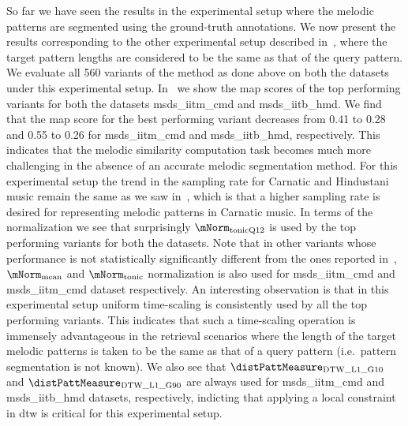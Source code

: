 So far we have seen the results in the experimental setup where the melodic patterns are segmented using the ground-truth annotations. We now present the results corresponding to the other experimental setup described in~, where the target pattern lengths are considered to be the same as that of the query pattern. We evaluate all 560 variants of the method as done above on both the datasets under this experimental setup. In~ we show the \gls{map} scores of the top performing variants for both the datasets \acrshort{msds_iitm_cmd} and \acrshort{msds_iitb_hmd}. We find that the \gls{map} score for the best performing variant decreases from 0.41 to 0.28 and 0.55 to 0.26 for \acrshort{msds_iitm_cmd} and \acrshort{msds_iitb_hmd}, respectively. This indicates that the melodic similarity computation task becomes much more challenging in the absence of an accurate melodic segmentation method. For this experimental setup the trend in the sampling rate for Carnatic and Hindustani music remain the same as we saw in~, which is that a higher sampling rate is desired for representing melodic patterns in Carnatic music. In terms of the normalization we see that surprisingly $\mNorm_{\mathrm{tonicQ12}}$ is used by the top performing variants for both the datasets. Note that in other variants whose performance is not statistically significantly different from the ones reported in~, $\mNorm_{\mathrm{mean}}$ and $\mNorm_{\mathrm{tonic}}$ normalization is also used for \acrshort{msds_iitm_cmd} and \acrshort{msds_iitm_cmd} dataset respectively. An interesting observation is that in this experimental setup uniform time-scaling is consistently used by all the top performing variants. This indicates that such a time-scaling operation is immensely advantageous in the retrieval scenarios where the length of the target melodic patterns is taken to be the same as that of a query pattern (i.e.~pattern segmentation is not known). We also see that $\distPattMeasure_{\mathrm{DTW\_L1\_G10}}$ and $\distPattMeasure_{\mathrm{DTW\_L1\_G90}}$ are always used for \acrshort{msds_iitm_cmd} and \acrshort{msds_iitb_hmd} datasets, respectively, indicting that applying a local constraint in \gls{dtw} is critical for this experimental setup.




